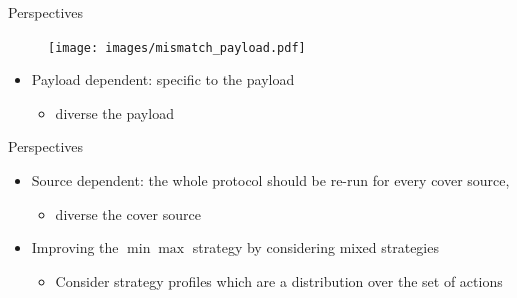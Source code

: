 \documentclass[10pt]{beamer}
\begin{document}
\begin{frame}{Perspectives}

    \begin{figure}[h]
        \texttt{[image: images/mismatch\_payload.pdf]}
    \end{figure}
    
    \begin{itemize}
        \item Payload dependent: specific to the payload
            \begin{itemize}
                \item diverse the payload
            \end{itemize}
    \end{itemize}


\end{frame}



\begin{frame}{Perspectives}
  
    \begin{itemize}
    
        \item Source dependent: the whole protocol should be re-run for every cover source,  
                
            \begin{itemize}
                \item diverse the cover source
            \end{itemize}
            
        \pause 
        
        \item Improving the $\min\max$ strategy by considering mixed strategies
            \begin{itemize}
                \item Consider strategy profiles which are a distribution over the set of actions
            \end{itemize}
    
    \end{itemize}

\end{frame}




\end{document}
